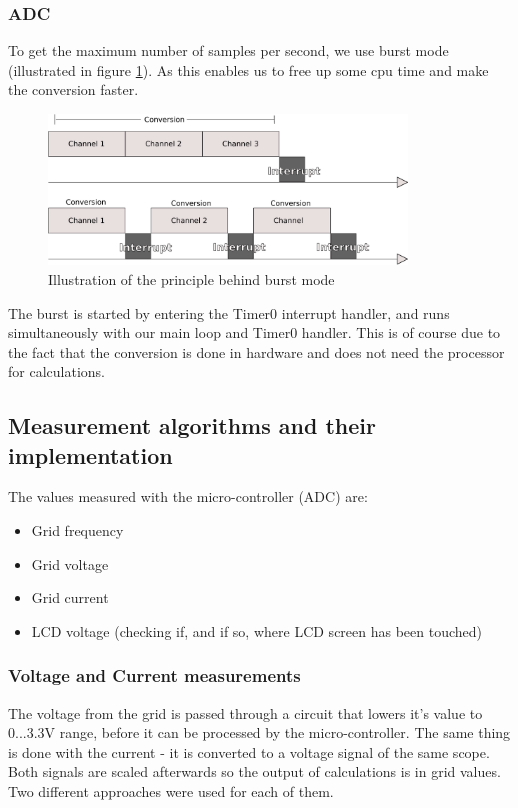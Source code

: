 \subsubsection{ADC}
To get the maximum number of samples per second, we use burst mode (illustrated in figure \ref{fig:burst_mode}). As this enables us to free up some cpu time and make the conversion faster.
\begin{figure}[!h]
  \centering
  \includegraphics[width=0.85\textwidth]{figs/burst_mode.pdf}
  \caption{Illustration of the principle behind burst mode}
  \label{fig:burst_mode}
\end{figure}
The burst is started by entering the Timer0 interrupt handler, and runs simultaneously with our main loop and Timer0 handler. This is of course due to the fact that the conversion is done in hardware and does not need the processor for calculations.

\subsection{Measurement algorithms and their implementation}
The values measured with the micro-controller (ADC) are:
\begin{itemize}
\item Grid frequency
\item Grid voltage
\item Grid current
\item LCD voltage (checking if, and if so, where LCD screen has been touched)
\end{itemize}

\subsubsection{Voltage and Current measurements}
The voltage from the grid is passed through a circuit that lowers it's value to 0...3.3V range, before it can be processed by the micro-controller. The same thing is done with the current - it is converted to a voltage signal of the same scope. Both signals are scaled afterwards so the output of calculations is in grid values. Two different approaches were used for each of them.

